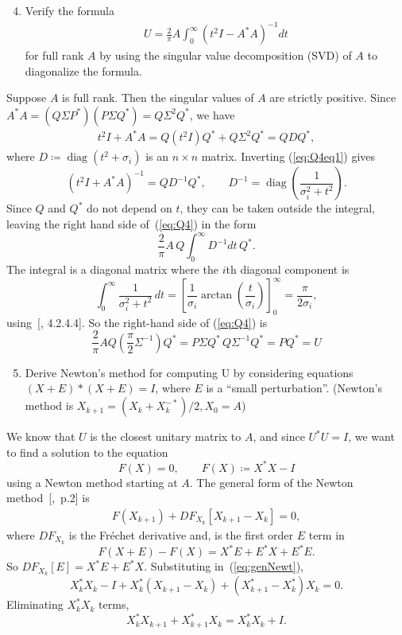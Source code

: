\documentclass[10pt, A4paper]{article}
\newcommand{\nxn}{n \times n}
\DeclareMathOperator{\diag}{diag}
\begin{document}
 
 
 

\vspace{0.2cm}
\begin{enumerate}
	\setcounter{enumi}{3}
	\item Verify the formula
	\begin{align*}
		U = \frac{2}{\pi}A \int_{0}^{\infty} (t^2I - A^*A)^{-1}dt
		\tag{*}
		\label{eq:Q4}
	\end{align*}
	for full rank $A$ by using the singular value decomposition (SVD)
	of $A$ to diagonalize the formula.
\end{enumerate}

Suppose $A$ is full rank. Then the singular values of $A$ are strictly 
positive. Since $A^*A = (Q\Sigma P^*)(P\Sigma Q^*) = Q\Sigma^2Q^*$, we 
have
\begin{align}
	t^2I + A^*A = Q(t^2I)Q^* + Q \Sigma^2Q^* = QDQ^*,
	\label{eq:Q4eq1}
\end{align}
where $D \coloneqq \diag(t^2 + \sigma_i)$ is an $\nxn$ matrix.
Inverting (\ref{eq:Q4eq1}) gives
$$
	(t^2I + A^*A)^{-1} = QD^{-1}Q^*, \qquad
	D^{-1} = \diag\left(\frac{1}{\sigma_i^2 + t^2} \right).
$$
Since $Q$ and $Q^*$ do not depend on $t$, they can be taken outside the 
integral, leaving the right hand side of~(\ref{eq:Q4}) in the form
$$
	\frac{2}{\pi} A\, Q\int_{0}^{\infty}D^{-1}dt\, Q^*.
$$
The integral is a diagonal matrix where the $i$th diagonal component is
$$
	\int_{0}^{\infty} \frac{1}{\sigma_i^2 + t^2} \, dt =
	\left[\frac{1}{\sigma_i} \arctan \left(\frac{t}{\sigma_i}\right)
	\right]_0^{\infty} = \frac{\pi}{2\sigma_i},
$$
using~[\citealp{jeda2008}, 4.2.4.4]. So the right-hand side of 
(\ref{eq:Q4}) is
$$
	\frac{2}{\pi} A Q \left(\frac{\pi}{2} \Sigma^{-1}\right)Q^* = 
	P\Sigma Q^* \, Q \Sigma^{-1}Q^* = PQ^* = U 
$$





\vspace{0.2cm}
\begin{enumerate}
	\setcounter{enumi}{4}
	\item Derive Newton's method for computing U by considering
	equations $(X+E)*(X+E) = I$, where $E$ is a ``small perturbation''.
	(Newton's method is $X_{k+1} = (X_k + X_k^{-*})/2, X_0 = A$)
\end{enumerate}

We know that $U$ is the closest unitary matrix to $A$, and since 
$U^*U=I$, we want to find a solution to the equation
$$
	F(X) = 0,\qquad F(X)\coloneqq X^*X - I
$$
using a Newton method starting at $A$.
The general form of the Newton method~{[\citealp{Kell2003},~p.2]} is
\begin{align}
	F(X_{k+1}) + DF_{X_k} \left[X_{k+1} - X_k\right] = 0,
	\label{eq:genNewt}
\end{align}
where $DF_{X_k}$ is the Fréchet derivative and, is the first order $E$ 
term in
$$
	F(X+E) - F(X) = X^*E + E^*X + E^*E.
$$
So $DF_{X_k}[E] = X^*E + E^*X$.
Substituting in~(\ref{eq:genNewt}),
$$
	X_k^*X_k - I + X_k^* \left( X_{k+1} - X_k \right) + 
		\left( X_{k+1}^* - X_k^* \right)X_k = 0.
$$
Eliminating $X_k^*X_k$ terms,
$$
	X_k^* X_{k+1} + X_{k+1}^*X_k = X_k^* X_k + I.
$$
\end{document}
